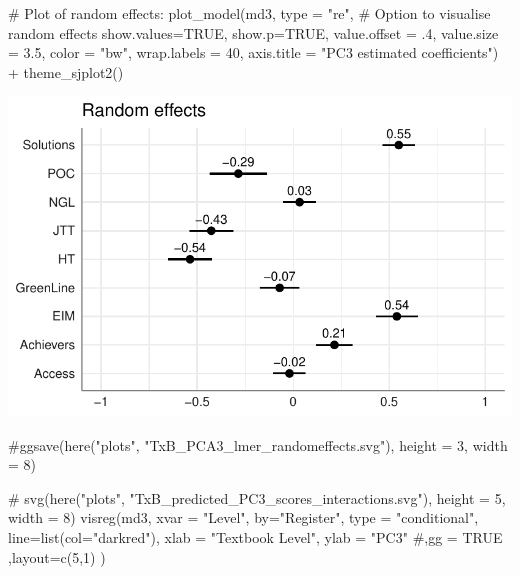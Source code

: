 \documentclass[
  letterpaper,
  DIV=11,
  numbers=noendperiod]{scrreprt}
\newenvironment{Shaded}{\begin{snugshade}}{\end{snugshade}}
\newcommand{\AttributeTok}[1]{\textcolor[rgb]{0.40,0.45,0.13}{#1}}
\newcommand{\CommentTok}[1]{\textcolor[rgb]{0.37,0.37,0.37}{#1}}
\newcommand{\ConstantTok}[1]{\textcolor[rgb]{0.56,0.35,0.01}{#1}}
\newcommand{\DecValTok}[1]{\textcolor[rgb]{0.68,0.00,0.00}{#1}}
\newcommand{\FloatTok}[1]{\textcolor[rgb]{0.68,0.00,0.00}{#1}}
\newcommand{\FunctionTok}[1]{\textcolor[rgb]{0.28,0.35,0.67}{#1}}
\newcommand{\NormalTok}[1]{\textcolor[rgb]{0.00,0.23,0.31}{#1}}
\newcommand{\SpecialCharTok}[1]{\textcolor[rgb]{0.37,0.37,0.37}{#1}}
\newcommand{\StringTok}[1]{\textcolor[rgb]{0.13,0.47,0.30}{#1}}
\begin{document}
\begin{Shaded}
\begin{Highlighting}[]
\CommentTok{\# Plot of random effects:}
\FunctionTok{plot\_model}\NormalTok{(md3, }
           \AttributeTok{type =} \StringTok{"re"}\NormalTok{, }\CommentTok{\# Option to visualise random effects}
           \AttributeTok{show.values=}\ConstantTok{TRUE}\NormalTok{, }
           \AttributeTok{show.p=}\ConstantTok{TRUE}\NormalTok{,}
           \AttributeTok{value.offset =}\NormalTok{ .}\DecValTok{4}\NormalTok{,}
           \AttributeTok{value.size =} \FloatTok{3.5}\NormalTok{,}
           \AttributeTok{color =} \StringTok{"bw"}\NormalTok{,}
           \AttributeTok{wrap.labels =} \DecValTok{40}\NormalTok{,}
           \AttributeTok{axis.title =} \StringTok{"PC3 estimated coefficients"}\NormalTok{) }\SpecialCharTok{+}
  \FunctionTok{theme\_sjplot2}\NormalTok{()}
\end{Highlighting}
\end{Shaded}

\includegraphics{E_Ch6_Analysis_files/figure-pdf/unnamed-chunk-28-1.pdf}

\begin{Shaded}
\begin{Highlighting}[]
\CommentTok{\#ggsave(here("plots", "TxB\_PCA3\_lmer\_randomeffects.svg"), height = 3, width = 8)}
\end{Highlighting}
\end{Shaded}

\begin{Shaded}
\begin{Highlighting}[]
\CommentTok{\# svg(here("plots", "TxB\_predicted\_PC3\_scores\_interactions.svg"), height = 5, width = 8)}
\FunctionTok{visreg}\NormalTok{(md3, }\AttributeTok{xvar =} \StringTok{"Level"}\NormalTok{, }\AttributeTok{by=}\StringTok{"Register"}\NormalTok{, }\AttributeTok{type =} \StringTok{"conditional"}\NormalTok{,}
       \AttributeTok{line=}\FunctionTok{list}\NormalTok{(}\AttributeTok{col=}\StringTok{"darkred"}\NormalTok{), }
       \AttributeTok{xlab =} \StringTok{"Textbook Level"}\NormalTok{, }\AttributeTok{ylab =} \StringTok{"PC3"}
       \CommentTok{\#,gg = TRUE}
\NormalTok{       ,}\AttributeTok{layout=}\FunctionTok{c}\NormalTok{(}\DecValTok{5}\NormalTok{,}\DecValTok{1}\NormalTok{)}
\NormalTok{)}
\end{Highlighting}
\end{Shaded}
\end{document}
